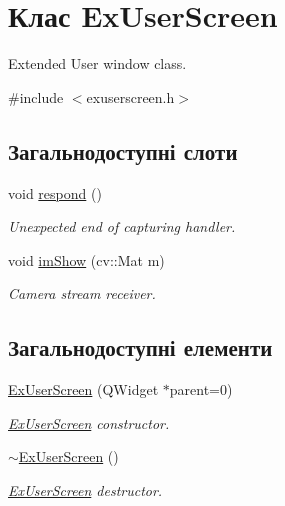 \hypertarget{classExUserScreen}{\section{Клас Ex\-User\-Screen}
\label{classExUserScreen}
}


Extended User window class.  




{\ttfamily \#include $<$exuserscreen.\-h$>$}

\subsection*{Загальнодоступні слоти}
\begin{DoxyCompactItemize}
\item 
\hypertarget{classExUserScreen_a02023bde7f3823dbeb460fddcef8341e}{void \hyperlink{classExUserScreen_a02023bde7f3823dbeb460fddcef8341e}{respond} ()}\label{classExUserScreen_a02023bde7f3823dbeb460fddcef8341e}

\begin{DoxyCompactList}\small\item\em Unexpected end of capturing handler. \end{DoxyCompactList}\item 
\hypertarget{classExUserScreen_ad479165ffd920e5ef152e5aff1ed4d6b}{void \hyperlink{classExUserScreen_ad479165ffd920e5ef152e5aff1ed4d6b}{im\-Show} (cv\-::\-Mat m)}\label{classExUserScreen_ad479165ffd920e5ef152e5aff1ed4d6b}

\begin{DoxyCompactList}\small\item\em Camera stream receiver. \end{DoxyCompactList}\end{DoxyCompactItemize}
\subsection*{Загальнодоступні елементи}
\begin{DoxyCompactItemize}
\item 
\hyperlink{classExUserScreen_a8642db4f09c4528daf7e22ce2dcc1b47}{Ex\-User\-Screen} (Q\-Widget $\ast$parent=0)
\begin{DoxyCompactList}\small\item\em \hyperlink{classExUserScreen}{Ex\-User\-Screen} constructor. \end{DoxyCompactList}\item 
\hypertarget{classExUserScreen_a61421cd56bb9b54501c4cb34d297891f}{\hyperlink{classExUserScreen_a61421cd56bb9b54501c4cb34d297891f}{$\sim$\-Ex\-User\-Screen} ()}\label{classExUserScreen_a61421cd56bb9b54501c4cb34d297891f}

\begin{DoxyCompactList}\small\item\em \hyperlink{classExUserScreen}{Ex\-User\-Screen} destructor. \end{DoxyCompactList}\end{DoxyCompactItemize}

